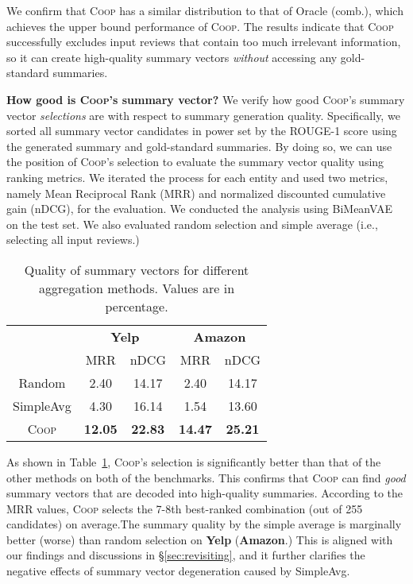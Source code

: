 \documentclass[11pt]{article}
\newcommand{\aggname}{\textsc{Coop}}
\newcommand{\name}{\mbox{\sc BiMeanVAE}}
\newcommand{\simpleavg}{\mbox{SimpleAvg}}
\newcommand{\yelp}{\mbox{\bf Yelp}}
\newcommand{\amazon}{\mbox{\bf Amazon}}
\newcommand{\hl}[1]{#1}
\begin{document}
We confirm that \aggname{} has a similar distribution to that of Oracle (comb.), which achieves the upper bound performance of \aggname. The results indicate that \aggname{} successfully excludes input reviews that contain too much irrelevant information, so it can create high-quality summary vectors {\em without} accessing any gold-standard summaries.

\noindent
{\bf How good is \aggname's summary vector?}
We verify how good \aggname's summary vector {\em selections} are with respect to summary generation quality.
Specifically, we sorted all summary vector candidates in power set  by the ROUGE-1 score using the generated summary and gold-standard summaries. By doing so, we can use the position of \aggname's selection to evaluate the summary vector quality using ranking metrics. 
We iterated the process for each entity  and used two metrics, namely Mean Reciprocal Rank (MRR) and normalized discounted cumulative gain (nDCG)\cite{schutze2008introduction}, for the evaluation.
We conducted the analysis using \name{} on the test set.
We also evaluated random selection and simple average (i.e., selecting all input reviews.)

\begin{table}[t]
    \centering
    \small
    \begin{tabular}{c|cccc}
    \toprule
        & \multicolumn{2}{c}{\yelp{}} & \multicolumn{2}{c}{\amazon{}}\\
        & MRR & nDCG & MRR & nDCG \\\midrule
        Random & 2.40 & 14.17 & 2.40 & 14.17 \\
        \simpleavg & 4.30 & 16.14 & 1.54 & 13.60\\
        \aggname{} & \textbf{12.05} & \textbf{22.83} & \textbf{14.47} & \textbf{25.21} \\
    \bottomrule
    \end{tabular}
    \caption{Quality of summary vectors for different aggregation methods. \hl{Values are in percentage.}}\label{tab:agg_rank}
\end{table}

As shown in Table~\ref{tab:agg_rank}, \aggname's selection is significantly better than that of the other methods on both of the benchmarks. This confirms that \aggname{} can find {\em good} summary vectors that are decoded into high-quality summaries.
According to the MRR values, \aggname{} selects the 7-8th best-ranked combination (out of 255 candidates) on average.The summary quality by the simple average is marginally better (worse) than random selection on \yelp{} (\amazon.)
This is aligned with our findings and discussions in \S\ref{sec:revisiting}, and it further clarifies the negative effects of summary vector degeneration caused by \simpleavg.
\end{document}
